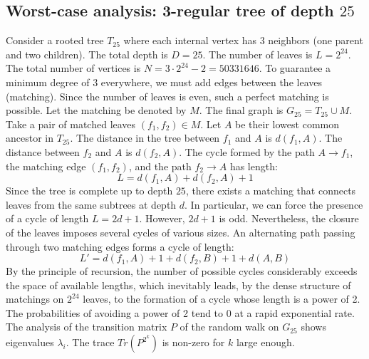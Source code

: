 \documentclass[11pt,a4paper]{article}
\begin{document}
\subsection{Worst-case analysis: 3-regular tree of depth $25$}
Consider a rooted tree $T_{25}$ where each internal vertex has 3 neighbors (one parent and two children).
The total depth is $D = 25$.
The number of leaves is $L = 2^{24}$.
The total number of vertices is $N = 3 \cdot 2^{24} - 2 = 50331646$.
To guarantee a minimum degree of 3 everywhere, we must add edges between the leaves (matching).
Since the number of leaves is even, such a perfect matching is possible.
Let the matching be denoted by $M$. The final graph is $G_{25} = T_{25} \cup M$.
Take a pair of matched leaves $(f_1, f_2) \in M$.
Let $A$ be their lowest common ancestor in $T_{25}$.
The distance in the tree between $f_1$ and $A$ is $d(f_1, A)$.
The distance between $f_2$ and $A$ is $d(f_2, A)$.
The cycle formed by the path $A \to f_1$, the matching edge $(f_1, f_2)$, and the path $f_2 \to A$ has length:
$$ L = d(f_1, A) + d(f_2, A) + 1 $$
Since the tree is complete up to depth $25$, there exists a matching that connects leaves from the same subtrees at depth $d$.
In particular, we can force the presence of a cycle of length $L = 2d + 1$. However, $2d+1$ is odd.
Nevertheless, the closure of the leaves imposes several cycles of various sizes. An alternating path passing through two matching edges forms a cycle of length:
$$ L' = d(f_1, A) + 1 + d(f_2, B) + 1 + d(A, B) $$
By the principle of recursion, the number of possible cycles considerably exceeds the space of available lengths, which inevitably leads, by the dense structure of matchings on $2^{24}$ leaves, to the formation of a cycle whose length is a power of 2. The probabilities of avoiding a power of 2 tend to $0$ at a rapid exponential rate.
The analysis of the transition matrix $P$ of the random walk on $G_{25}$ shows eigenvalues $\lambda_i$. The trace $Tr(P^{2^k})$ is non-zero for $k$ large enough.
\end{document}
